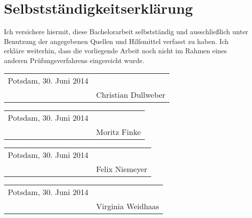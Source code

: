 \documentclass[Bachelorarbeit_Vorlage.tex]{subfiles}
\begin{document}
	\thispagestyle{plain}

	\section*{Selbstständigkeitserklärung}

	Ich versichere hiermit, diese Bachelorarbeit selbstständig und ausschließlich unter Benutzung der angegebenen Quellen und Hilfsmittel verfasst zu haben. Ich erkläre weiterhin, dass die vorliegende Arbeit noch nicht im Rahmen eines anderen Prüfungsverfahrens eingereicht wurde.

	\vspace{2cm}
	\begin{tabularx}{\textwidth}{ p{5cm} X }
	Potsdam, 30. Juni 2014 & \\
	\cline{2-2}
	& \small{Christian Dullweber} \\
	\end{tabularx}

	\vspace{2cm}
	\begin{tabularx}{\textwidth}{ p{5cm} X }
	Potsdam, 30. Juni 2014 & \\
	\cline{2-2}
	& \small{Moritz Finke} \\
	\end{tabularx}

	\vspace{2cm}
	\begin{tabularx}{\textwidth}{ p{5cm} X }
	Potsdam, 30. Juni 2014 & \\
	\cline{2-2}
	& \small{Felix Niemeyer} \\
	\end{tabularx}
	
	\vspace{2cm}
	\begin{tabularx}{\textwidth}{ p{5cm} X }
	Potsdam, 30. Juni 2014 & \\
	\cline{2-2}
	& \small{Virginia Weidhaas} \\
	\end{tabularx}
	
\end{document}
